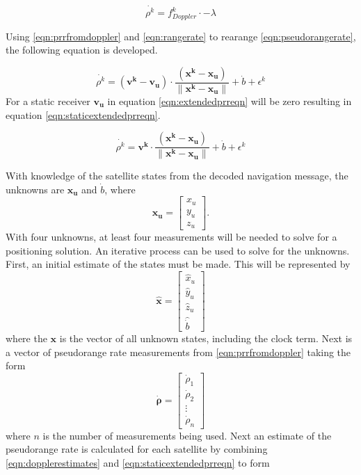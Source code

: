 \documentclass[12pt]{report}
\begin{document}
\begin{equation}
    \dot{\rho^{k}} = f_{Doppler}^{k} \cdot -\lambda
    \label{eqn:prrfromdoppler}
\end{equation}

Using \ref{eqn:prrfromdoppler} and \ref{eqn:rangerate} to rearange \ref{eqn:pseudorangerate}, the following equation is developed.

\begin{equation}
    \dot{\rho^{k}} = (\mathbf{v^{k}} - \mathbf{v_u}) \cdot \frac{(\mathbf{x^k} - \mathbf{x_u})}{\| \mathbf{x^k} - \mathbf{x_u}\|} + \dot{b} + \epsilon^{k}
    \label{eqn:extendedprreqn}
\end{equation}
For a static receiver $\mathbf{v_u}$ in equation \ref{eqn:extendedprreqn} will be zero resulting in equation \ref{eqn:staticextendedprreqn}.

\begin{equation}
    \dot{\rho^{k}} = \mathbf{v^{k}} \cdot \frac{(\mathbf{x^k} - \mathbf{x_u})}{\| \mathbf{x^k} - \mathbf{x_u}\|} + \dot{b} + \epsilon^{k}
    \label{eqn:staticextendedprreqn}
\end{equation}

With knowledge of the satellite states from the decoded navigation message, the unknowns are $\mathbf{x_u}$ and $\dot{b}$, where
\begin{equation}
\mathbf{x_u} = 
\begin{bmatrix}
        x_u\\
        y_u\\
        z_u 
\end{bmatrix}.
\end{equation}
With four unknowns, at least four measurements will be needed to solve for a positioning solution. An iterative process can be used to solve for the unknowns. 
First, an initial estimate of the states must be made. This will be represented by
\begin{equation}
    \mathbf{\hat{x}} = 
    \begin{bmatrix}
        \hat{x}_u\\
        \hat{y}_u\\
        \hat{z}_u\\
        \hat{\dot{b}}
    \end{bmatrix}
    \label{eqn:dopplerestimates}
\end{equation}
where the $\mathbf{x}$ is the vector of all unknown states, including the clock term.
Next is a vector of pseudorange rate measurements from \ref{eqn:prrfromdoppler} taking the form
\begin{equation}
\mathbf{\dot{\rho}} = \begin{bmatrix}
    \dot{\rho}_1 \\
    \dot{\rho}_2 \\
    \vdots\\
    \dot{\rho}_n
\end{bmatrix}
\end{equation}
where $n$ is the number of measurements being used. Next an estimate of the pseudorange rate is calculated for each satellite by combining \ref{eqn:dopplerestimates} and \ref{eqn:staticextendedprreqn} to form 
\end{document}
